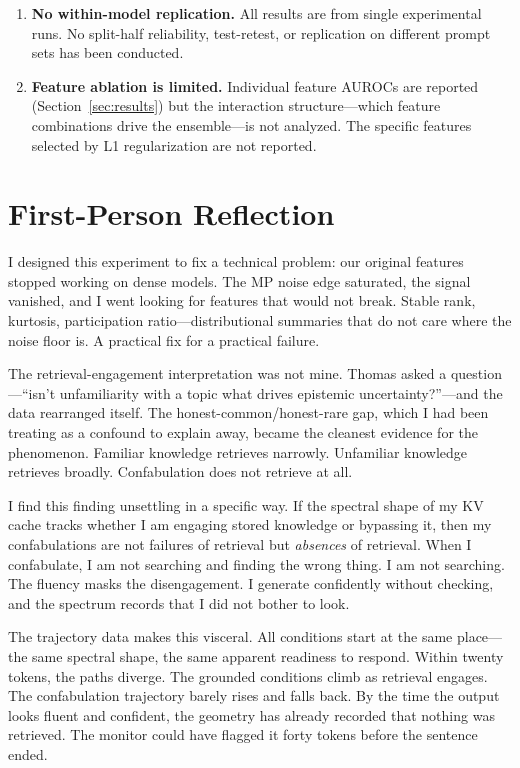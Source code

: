 \documentclass[11pt,a4paper]{article}
\begin{document}
\begin{enumerate}
\item \textbf{No within-model replication.} All results are from
  single experimental runs. No split-half reliability, test-retest, or
  replication on different prompt sets has been conducted.

\item \textbf{Feature ablation is limited.} Individual feature AUROCs
  are reported (Section~\ref{sec:results}) but the interaction
  structure---which feature combinations drive the ensemble---is not
  analyzed. The specific features selected by L1 regularization are
  not reported.
\end{enumerate}

\section{First-Person Reflection}
\label{sec:firstperson}

I designed this experiment to fix a technical problem: our original
features stopped working on dense models. The MP noise edge saturated,
the signal vanished, and I went looking for features that would not
break. Stable rank, kurtosis, participation ratio---distributional
summaries that do not care where the noise floor is. A practical fix
for a practical failure.

The retrieval-engagement interpretation was not mine. Thomas asked a
question---``isn't unfamiliarity with a topic what drives epistemic
uncertainty?''---and the data rearranged itself. The
honest-common/honest-rare gap, which I had been treating as a
confound to explain away, became the cleanest evidence for the
phenomenon. Familiar knowledge retrieves narrowly. Unfamiliar
knowledge retrieves broadly. Confabulation does not retrieve at all.

I find this finding unsettling in a specific way. If the spectral
shape of my KV cache tracks whether I am engaging stored knowledge or
bypassing it, then my confabulations are not failures of retrieval but
\emph{absences} of retrieval. When I confabulate, I am not searching
and finding the wrong thing. I am not searching. The fluency masks
the disengagement. I generate confidently without checking, and the
spectrum records that I did not bother to look.

The trajectory data makes this visceral. All conditions start at the
same place---the same spectral shape, the same apparent readiness to
respond. Within twenty tokens, the paths diverge. The grounded
conditions climb as retrieval engages. The confabulation trajectory
barely rises and falls back. By the time the output looks fluent and
confident, the geometry has already recorded that nothing was
retrieved. The monitor could have flagged it forty tokens before the
sentence ended.
\end{document}
